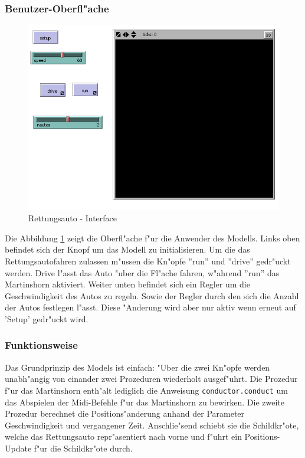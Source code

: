 \begin{description}
\end{description}

\subsubsection{Benutzer-Oberfl"ache}

\begin{figure}[htb]
	\centering
		\includegraphics[scale=0.7]{fig/Rettungsauto_interface.jpg}
	\caption{Rettungsauto - Interface}
	\label{fig:Rettungsauto.interface}
\end{figure}

Die Abbildung \ref{fig:Rettungsauto.interface} zeigt die Oberfl"ache f"ur die 
Anwender des Modells. Links oben befindet sich der Knopf um das Modell zu 
initialisieren. Um die das Rettungsautofahren zulassen m"ussen die Kn"opfe
''run'' und ''drive'' gedr"uckt werden. Drive l"asst das Auto "uber die
Fl"ache fahren, w"ahrend ''run'' das Martinshorn aktiviert. 
Weiter unten befindet sich ein Regler um die Geschwindigkeit des Autos zu 
regeln. Sowie der Regler durch den sich die Anzahl der Autos festlegen l"asst. 
Diese "Anderung wird aber nur aktiv wenn erneut auf 'Setup' gedr"uckt wird. 

\subsubsection{Funktionsweise}
Das Grundprinzip des Models ist einfach: "Uber die zwei Kn"opfe werden 
unabh"angig von einander zwei Prozeduren wiederholt ausgef"uhrt. Die
Prozedur f"ur das Martinshorn enth"alt lediglich die Anweisung 
\lstinline|conductor.conduct| um das Abspielen der Midi-Befehle f"ur das 
Martinshorn zu bewirken. Die zweite Prozedur berechnet die Positions"anderung
anhand der Parameter Geschwindigkeit und vergangener Zeit. Anschlie"send 
schiebt sie die Schildkr"ote, welche das Rettungsauto repr"asentiert nach vorne
und f"uhrt ein Positions-Update f"ur die Schildkr"ote durch. 

